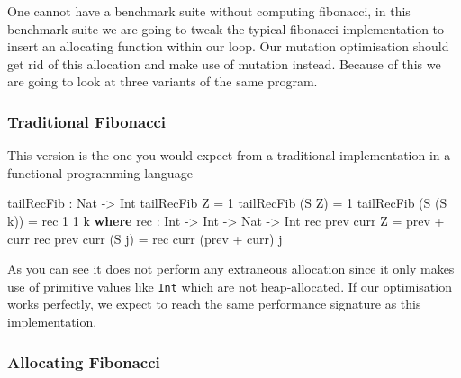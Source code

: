 \documentclass[
]{article}
\newenvironment{Shaded}{}{}
\newcommand{\DataTypeTok}[1]{\textcolor[rgb]{0.56,0.13,0.00}{#1}}
\newcommand{\DecValTok}[1]{\textcolor[rgb]{0.25,0.63,0.44}{#1}}
\newcommand{\KeywordTok}[1]{\textcolor[rgb]{0.00,0.44,0.13}{\textbf{#1}}}
\newcommand{\NormalTok}[1]{#1}
\newcommand{\OperatorTok}[1]{\textcolor[rgb]{0.40,0.40,0.40}{#1}}
\newcommand{\OtherTok}[1]{\textcolor[rgb]{0.00,0.44,0.13}{#1}}
\begin{document}
One cannot have a benchmark suite without computing fibonacci, in this
benchmark suite we are going to tweak the typical fibonacci
implementation to insert an allocating function within our loop. Our
mutation optimisation should get rid of this allocation and make use of
mutation instead. Because of this we are going to look at three variants
of the same program.

\hypertarget{traditional-fibonacci}{%
\subsubsection{Traditional Fibonacci}\label{traditional-fibonacci}}

This version is the one you would expect from a traditional
implementation in a functional programming language

\begin{Shaded}
\begin{Highlighting}[]
\NormalTok{tailRecFib }\OperatorTok{:} \DataTypeTok{Nat} \OtherTok{{-}\textgreater{}} \DataTypeTok{Int}
\NormalTok{tailRecFib }\DataTypeTok{Z} \OtherTok{=} \DecValTok{1}
\NormalTok{tailRecFib (}\DataTypeTok{S} \DataTypeTok{Z}\NormalTok{) }\OtherTok{=} \DecValTok{1}
\NormalTok{tailRecFib (}\DataTypeTok{S}\NormalTok{ (}\DataTypeTok{S}\NormalTok{ k)) }\OtherTok{=}\NormalTok{ rec }\DecValTok{1} \DecValTok{1}\NormalTok{ k}
  \KeywordTok{where}
\NormalTok{    rec }\OperatorTok{:} \DataTypeTok{Int} \OtherTok{{-}\textgreater{}} \DataTypeTok{Int} \OtherTok{{-}\textgreater{}} \DataTypeTok{Nat} \OtherTok{{-}\textgreater{}} \DataTypeTok{Int}
\NormalTok{    rec prev curr }\DataTypeTok{Z} \OtherTok{=}\NormalTok{ prev }\OperatorTok{+}\NormalTok{ curr}
\NormalTok{    rec prev curr (}\DataTypeTok{S}\NormalTok{ j) }\OtherTok{=}\NormalTok{ rec curr (prev }\OperatorTok{+}\NormalTok{ curr) j}
\end{Highlighting}
\end{Shaded}

As you can see it does not perform any extraneous allocation since it
only makes use of primitive values like \texttt{Int} which are not
heap-allocated. If our optimisation works perfectly, we expect to reach
the same performance signature as this implementation.

\hypertarget{allocating-fibonacci}{%
\subsubsection{Allocating Fibonacci}\label{allocating-fibonacci}}
\end{document}
